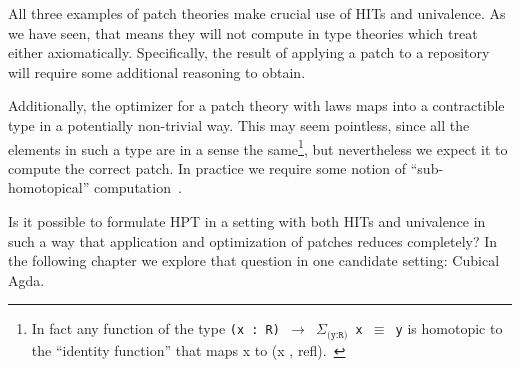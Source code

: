 All three examples of patch theories make crucial use of HITs and univalence.
As we have seen, that means they will not compute in type theories which treat
either axiomatically. Specifically, the result of applying a patch to a
repository will require some additional reasoning to obtain.

Additionally, the optimizer for a patch theory with laws maps into a
contractible type in a potentially non-trivial way. This may seem pointless, since all the
elements in such a type are in a sense the same\footnote{In fact any
  function of the type \texttt{(x : R) $\rightarrow$ $\Sigma_\texttt{(y:R)}$ x
  $\equiv$ y} is homotopic to the ``identity function'' that maps x to (x ,
refl).~\cite{Angiuli2016}}, but nevertheless we expect it to compute the correct
patch. In practice we require some notion of ``sub-homotopical'' computation~\cite{Angiuli2016}.

Is it possible to formulate HPT in a setting with both HITs and univalence in
such a way that application and optimization of patches reduces completely?
In the following chapter we explore that question in one candidate setting:
Cubical Agda.



